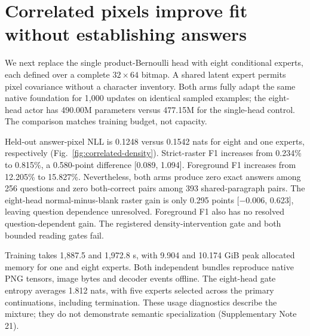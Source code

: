 
\section*{Correlated pixels improve fit without establishing answers}
We next replace the single product-Bernoulli head with eight conditional
experts, each defined over a complete $32\times64$ bitmap. A shared latent
expert permits pixel covariance without a character inventory. Both arms
fully adapt the same native foundation for 1,000 updates on identical sampled
examples; the eight-head actor has 490.00M parameters versus 477.15M for the
single-head control. The comparison matches training budget, not capacity.

Held-out answer-pixel NLL is 0.1248 versus 0.1542 nats for eight and one
experts, respectively (Fig.~\ref{fig:correlated-density}). Strict-raster F1
increases from 0.234\% to 0.815\%, a 0.580-point difference [0.089, 1.094].
Foreground F1 increases from 12.205\% to 15.827\%. Nevertheless, both arms
produce zero exact answers among 256 questions and zero both-correct pairs
among 393 shared-paragraph pairs. The eight-head normal-minus-blank raster
gain is only 0.295 points [$-0.006$, 0.623], leaving question dependence
unresolved. Foreground F1 also has no resolved question-dependent gain.
The registered density-intervention gate and both bounded reading gates fail.

Training takes 1,887.5 and 1,972.8 s, with 9.904 and 10.174 GiB peak allocated
memory for one and eight experts. Both independent bundles reproduce native
PNG tensors, image bytes and decoder events offline. The eight-head gate
entropy averages 1.812 nats, with five experts selected across the primary
continuations, including termination. These usage diagnostics describe the
mixture; they do not demonstrate semantic specialization (Supplementary
Note 21).

